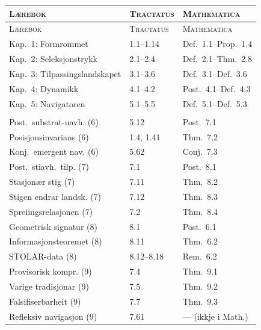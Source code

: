 \medskip
{\small
\begin{longtable}{@{}p{42mm}p{24mm}p{22mm}@{}}
\toprule
\textsc{Lærebok} & \textsc{Tractatus} & \textsc{Mathematica} \\
\midrule
\endfirsthead
\toprule
\textsc{Lærebok} & \textsc{Tractatus} & \textsc{Mathematica} \\
\midrule
\endhead
\bottomrule
\endfoot

Kap.~1: Formrommet & 1.1--1.14 & Def.~1.1--Prop.~1.4 \\
Kap.~2: Seleksjonstrykk & 2.1--2.4 & Def.~2.1--Thm.~2.8 \\
Kap.~3: Tilpassingslandskapet & 3.1--3.6 & Def.~3.1--Def.~3.6 \\
Kap.~4: Dynamikk & 4.1--4.2 & Post.~4.1--Def.~4.3 \\
Kap.~5: Navigatoren & 5.1--5.5 & Def.~5.1--Def.~5.3 \\
\addlinespace
\multicolumn{3}{@{}l}{\itshape Kapittel 6--9 nedanfor:} \\
\addlinespace
Post.\ substrat-uavh. (6) & 5.12 & Post.~7.1 \\
Posisjonsinvarians (6) & 1.4, 1.41 & Thm.~7.2 \\
Konj.\ emergent nav. (6) & 5.62 & Conj.~7.3 \\
\addlinespace
Post.\ stiavh.\ tilp. (7) & 7.1 & Post.~8.1 \\
Stasjonær stig (7) & 7.11 & Thm.~8.2 \\
Stigen endrar landsk. (7) & 7.12 & Thm.~8.3 \\
Spreiingsrelasjonen (7) & 7.2 & Thm.~8.4 \\
\addlinespace
Geometrisk signatur (8) & 8.1 & Post.~6.1 \\
Informasjonsteoremet (8) & 8.11 & Thm.~6.2 \\
STOLAR-data (8) & 8.12--8.18 & Rem.~6.2 \\
\addlinespace
Provisorisk kompr. (9) & 7.4 & Thm.~9.1 \\
Varige tradisjonar (9) & 7.5 & Thm.~9.2 \\
Falsifiserbarheit (9) & 7.7 & Thm.~9.3 \\
Refleksiv navigasjon (9) & 7.61 & --- (ikkje i Math.) \\
\end{longtable}
}


